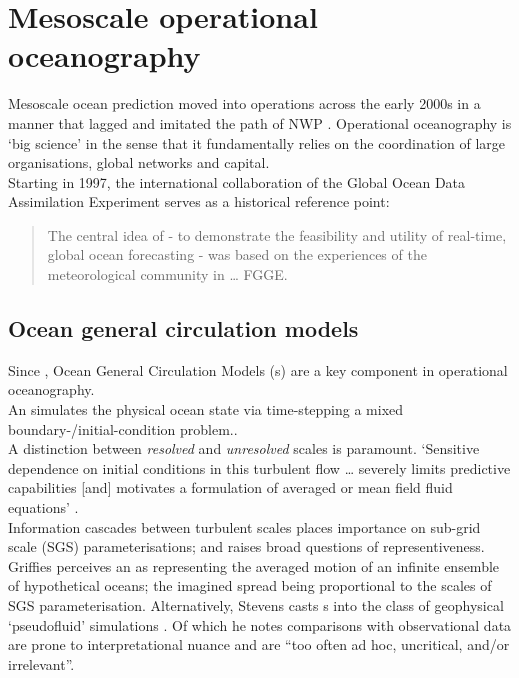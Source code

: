 \section{Mesoscale operational oceanography}
\label{sec:operational_oceanography}

Mesoscale ocean prediction moved into operations across the early 2000s in a manner that lagged and imitated the path of NWP \citep{Harper:2008ub}. Operational oceanography is `big science' \citep{Petersen:2012tr} in the sense that it fundamentally relies on the coordination of large organisations, global networks and capital. \\
Starting in 1997, the international collaboration of the Global Ocean Data Assimilation Experiment \GODAE{} serves as a historical reference point:

\begin{quote}
  The central idea of \GODAE{} - to demonstrate the feasibility and utility of real-time, global ocean forecasting - was based on the experiences of the meteorological community in \dots{} FGGE. \citep{Bell:2009uv}
\end{quote}


\subsection{Ocean general circulation models}

Since \GODAE{}, Ocean General Circulation Models (\OGCM{}s) are a key component in operational oceanography.\\

An \OGCM{} simulates the physical ocean state via time-stepping a mixed boundary-/initial-condition problem.\citep{Griffies:2004vs}.\\
A distinction between \emph{resolved} and \emph{unresolved} scales is paramount.  `Sensitive dependence on initial conditions in this turbulent flow \dots{} severely limits predictive capabilities [and] motivates a formulation of averaged or mean field fluid equations' \citep[Sec 2.5]{Griffies:2004vs}.\\


Information cascades between turbulent scales places importance on sub-grid scale (SGS) parameterisations; and raises broad questions of representiveness.\\
Griffies perceives an \OGCM{} as representing the averaged motion of an infinite ensemble of hypothetical oceans; the imagined spread being proportional to the scales of SGS parameterisation.
Alternatively, Stevens casts \OGCM{}s into the class of geophysical `pseudofluid' simulations \citep{Stevens:2001kb}. Of which he notes comparisons with observational data are prone to interpretational nuance and are ``too often ad hoc, uncritical, and/or irrelevant''\citep[pp 286]{Stevens:2001kb}. \\

